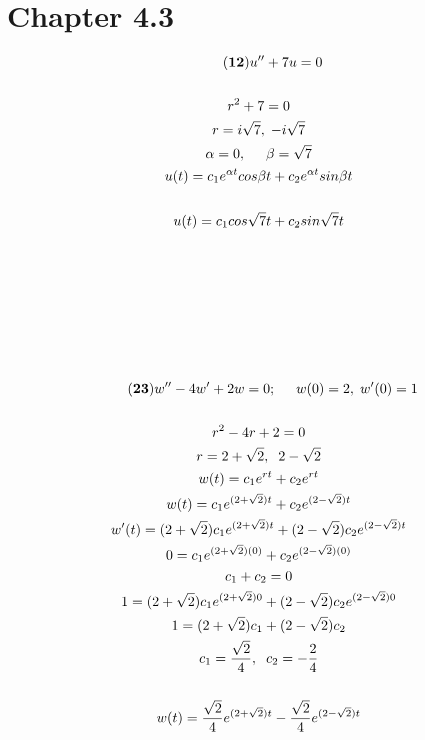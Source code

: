 \documentclass{article}
\begin{document}
\section*{Chapter 4.3}
\begin{gather*}\tag{\textbf{12}}
    u''+7u = 0\\\\
    r^2+7 = 0\\
    r = i\sqrt{7}, \; -i\sqrt{7}\\
    \alpha = 0, \hspace{.5cm} \beta = \sqrt{7}\\
    u(t)=c_1e^{\alpha t}cos\beta t + c_2e^{\alpha t}sin\beta t\\\\
    u(t) = c_1cos\sqrt{7}t+c_2sin\sqrt{7}t\\\\\\\\\\\\\\\\
    \tag{\textbf{23}}
    w'' - 4w' +2w = 0; \hspace{.5cm}
    w(0) = 2, \hspace{.1cm} w'(0) = 1\\\\
    r^2-4r+2=0\\
    r = 2 + \sqrt{2},\hspace{.2cm} 2 -\sqrt{2}\\
    w(t)=c_1e^{rt}+c_2e^{rt}\\
    w(t) = c_1e^{(2+\sqrt{2})t}+c_2e^{(2-\sqrt{2})t}\\
    w'(t) = (2+\sqrt{2})c_1e^{(2+\sqrt{2})t} + (2-\sqrt{2})c_2e^{(2-\sqrt{2})t}\\
    0 = c_1e^{(2+\sqrt{2})(0)}+c_2e^{(2-\sqrt{2})(0)}\\
    c_1+c_2 = 0\\
    1 = (2+\sqrt{2})c_1e^{(2+\sqrt{2})0} + (2-\sqrt{2})c_2e^{(2-\sqrt{2})0}\\
    1 = (2+\sqrt{2})c_1 + (2-\sqrt{2})c_2\\
    c_1 = \frac{\sqrt{2}}{4}, \hspace{.2cm}c_2 = -\frac{2}{4}\\\\
    w(t) = \frac{\sqrt{2}}{4}e^{(2+\sqrt{2})t}-\frac{\sqrt{2}}{4}e^{(2-\sqrt{2})t}\\
\end{gather*}
\end{document}
